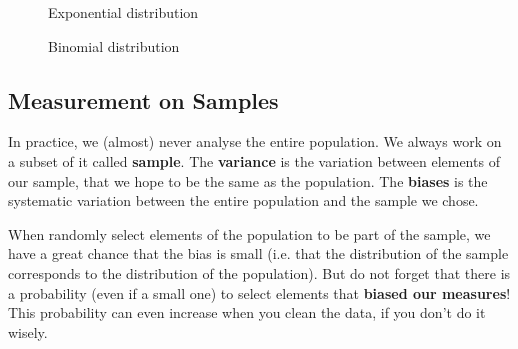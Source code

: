 \begin{figure}[H]
{ 
}
\caption{\label{exp} 
Exponential distribution 
} 
\centerline{
}
\caption{\label{binomial} 
Binomial distribution 
} 
\end{figure}



\subsection{Measurement on Samples}

In practice, we (almost) never analyse the entire population. We always work on a subset of it called \textbf{sample}. The \textbf{variance} is the variation between elements of our sample, that we hope to be the same as the population. The \textbf{biases} is the systematic variation between the entire population and the sample we chose.

When randomly select elements of the population to be part of the sample, we have a great chance that the bias is small (i.e. that the distribution of the sample corresponds to the distribution of the population). But do not forget that there is a probability (even if a small one) to select elements that \textbf{biased our measures}! This probability can even increase when you clean the data, if you don't do it wisely.

